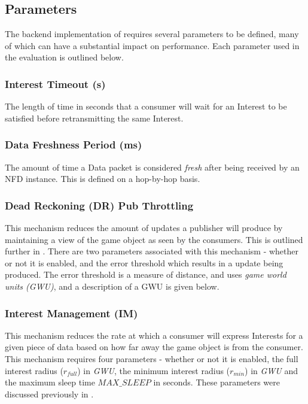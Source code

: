 \subsection{Parameters}
The backend implementation of \game{} requires several parameters to be defined, many of which can have a substantial impact on performance. Each parameter used in the evaluation is outlined below.

\subsubsection*{Interest Timeout (s)}
The length of time in seconds that a consumer will wait for an Interest to be satisfied before retransmitting the same Interest.

\subsubsection*{Data Freshness Period (ms)}
The amount of time a Data packet is considered \textit{fresh} after being received by an NFD instance. This is defined on a hop-by-hop basis.

\subsubsection*{Dead Reckoning (DR) Pub Throttling}
This mechanism reduces the amount of updates a publisher will produce by maintaining a view of the game object as seen by the consumers. This is outlined further in . There are two parameters associated with this mechanism - whether or not it is enabled, and the error threshold which results in a update being produced. The error threshold is a measure of distance, and uses \textit{game world units (GWU)}, and a description of a GWU is given below.


\subsubsection*{Interest Management (IM)}
This mechanism reduces the rate at which a consumer will express Interests for a given piece of data based on how far away the game object is from the consumer. This mechanism requires four parameters - whether or not it is enabled, the full interest radius ($r_{full}$) in \textit{GWU}, the minimum interest radius ($r_{min}$) in \textit{GWU} and the maximum sleep time $MAX\_SLEEP$ in seconds. These parameters were discussed previously in . 

